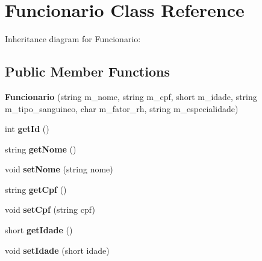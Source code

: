 \hypertarget{classFuncionario}{}\section{Funcionario Class Reference}
\label{classFuncionario}


Inheritance diagram for Funcionario\+:
\subsection*{Public Member Functions}
\begin{DoxyCompactItemize}
\item 
\mbox{\label{classFuncionario_a3f6f7108733ffeb519b17d68b12f1228}} 
{\bfseries Funcionario} (string m\+\_\+nome, string m\+\_\+cpf, short m\+\_\+idade, string m\+\_\+tipo\+\_\+sanguineo, char m\+\_\+fator\+\_\+rh, string m\+\_\+especialidade)
\item 
\mbox{\label{classFuncionario_a0288286a907e587b7ab75d6c23354a06}} 
int {\bfseries get\+Id} ()
\item 
\mbox{\label{classFuncionario_a13f42e2a8cb0515371b49745e5830c4c}} 
string {\bfseries get\+Nome} ()
\item 
\mbox{\label{classFuncionario_aa7876648c2ad5e3f4d3befcabcce0b1c}} 
void {\bfseries set\+Nome} (string nome)
\item 
\mbox{\label{classFuncionario_a88db81a06dcaf2115e71be3b1fe8bd1c}} 
string {\bfseries get\+Cpf} ()
\item 
\mbox{\label{classFuncionario_a24de20bbd458ab4723f2f7b42732cf79}} 
void {\bfseries set\+Cpf} (string cpf)
\item 
\mbox{\label{classFuncionario_ac8b1947b4cb1c1216291c4750670fba2}} 
short {\bfseries get\+Idade} ()
\item 
\mbox{\label{classFuncionario_af85eeb2e2b606d60da800c7084f23769}} 
void {\bfseries set\+Idade} (short idade)
\item 
\mbox{\label{classFuncionario_aedc6d72aaa308192628b749db2fad037}} 

\end{DoxyCompactItemize}
